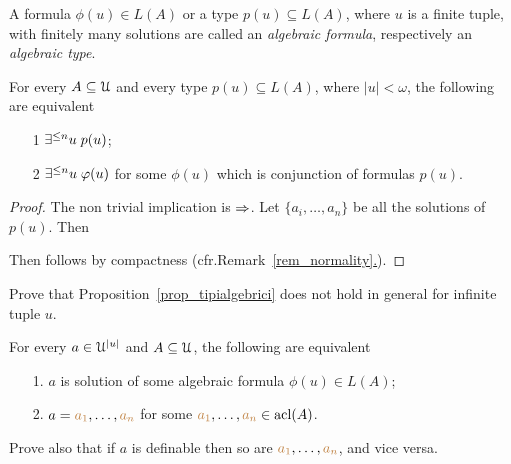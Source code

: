 A formula $\phi(u)\in L(A)$ or a type $p(u)\subseteq L(A)$, where $u$ is a finite tuple, with finitely many solutions are called an \emph{algebraic formula}, respectively an \emph{algebraic type}.
\begin{proposition}\label{prop_tipialgebrici}
For every $A\subseteq\EuScript U$ and every type $p(u)\subseteq L(A)$, where $|u|<\omega$, the following are equivalent
\begin{itemize} 
\item[1] $\exists^{\le n}u\; p(u)$;
\item[2] $\exists^{\le n}u\;\varphi(u)$ for some $\phi(u)$ which is conjunction of formulas $p(u)$.
\end{itemize}
\end{proposition}
\begin{proof} The non trivial implication is $\Rightarrow$. Let $\{a_i,\dots,a_n\}$ be all the solutions of $p(u)$. Then 


Then  follows by compactness (cfr.\@ Remark~\hyperref[rem_normality]{\ref*{rem_normality}.}).
% 
% 
% 
% 
\end{proof}

\begin{exercise}
Prove that Proposition~\ref{prop_tipialgebrici} does not hold in general for infinite tuple $u$.\QED
\end{exercise}

\begin{exercise}
For every $a\in\EuScript U^{|u|}$ and $A\subseteq\EuScript U$, the following are equivalent
\begin{itemize}
\item[1.] $a$ is solution of some algebraic formula  $\phi(u)\in L(A)$;
\item[2.] $a={\color{brown} a_1},\dots,{\color{brown} a_n}$ for some ${\color{brown} a_1},\dots,{\color{brown} a_n}\in\mathop{\rm acl}(A)$. 
\end{itemize}
Prove also that if $a$ is definable then so are ${\color{brown} a_1},\dots,{\color{brown} a_n}$, and vice versa.\QED
\end{exercise}


